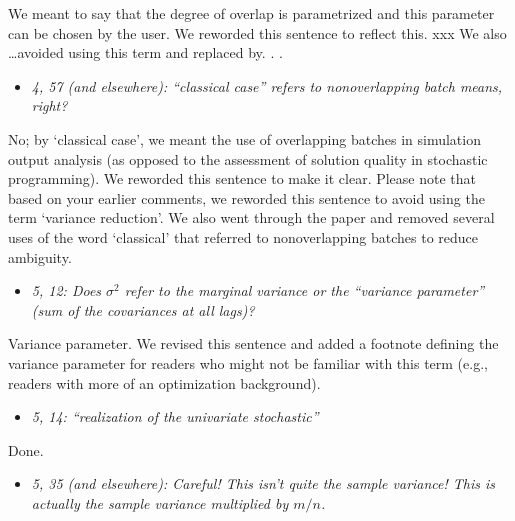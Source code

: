 \documentclass[11pt,notitlepage,onecolumn]{article}
\newcommand{\noi}{\noindent}
\begin{document}
\noi
We meant to say that the degree of overlap is parametrized and this parameter can be chosen by the user. 
We reworded this sentence to reflect this. 
xxx  We also \ldots avoided using this term and replaced by. . . 
\medskip 



\begin{itemize}
\item[] \textit{4, 57 (and elsewhere): ``classical case'' refers to nonoverlapping batch means, right?}
\end{itemize}

\noi
No; by `classical case', we meant the use of overlapping batches in simulation output analysis (as opposed to the assessment of solution quality in stochastic programming). 
We reworded this sentence to make it clear. 
Please note that based on your earlier comments, we reworded this sentence to avoid using the term `variance reduction'. 
We also went through the paper and removed several uses of the word `classical' that referred to nonoverlapping batches to reduce ambiguity.
\medskip 



\begin{itemize}
\item[] \textit{5, 12: Does $\sigma^2$ refer to the marginal variance or the ``variance parameter'' (sum of the covariances at all lags)?}
\end{itemize}

\noi
Variance parameter. 
We revised this sentence and added a footnote defining the variance parameter for readers who might not be familiar with this term (e.g., readers with more of an optimization background). 
\medskip 



\begin{itemize}
\item[] \textit{5, 14: ``realization of the univariate stochastic''}
\end{itemize}

\noi
Done.  
\medskip 


\begin{itemize}
\item[] \textit{5, 35 (and elsewhere): Careful! This isn't quite the sample variance! This is actually the sample variance multiplied by $m/n$.}
\end{itemize}
\end{document}
